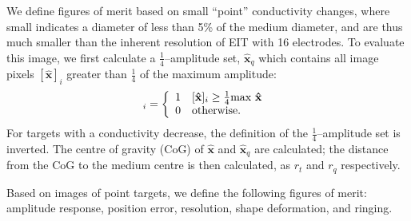 \documentclass[12pt]{iopart}
\newcommand{\xH}{\mbox{$\mathbf{\hat x}$}}
\begin{document}
We define figures of merit based on small ``point''
conductivity changes, where small indicates a diameter
of less than 5\% of the medium diameter, and are thus
much smaller than the inherent resolution of EIT with
16 electrodes.
To evaluate this image, we first calculate
a $\frac{1}{4}$--amplitude set, $\xH_q$ which
contains all image pixels $[\xH]_i$ greater
than $\frac{1}{4}$ of the maximum amplitude:
\begin{equation}
[\xH_q]_i = \left\{ \begin{array}{ll}
    1 & [\xH]_i  \geq \mbox{$ \frac{1}{4}\mathrm{max}~\xH$ } \\
    0 & \mbox{otherwise}.
\end{array} \right.
\end{equation}
For targets
with a conductivity decrease, the definition
of the $\frac{1}{4}$--amplitude set is inverted.
The centre of gravity (CoG) of $\xH$ and $\xH_q$ are
calculated; the distance from the CoG to the 
medium centre is then calculated, as $r_t$ and $r_q$
respectively.

Based on images of point targets, we define the following
figures of merit:
amplitude response,
position error,
resolution,
shape deformation, and
ringing. 
\end{document}
